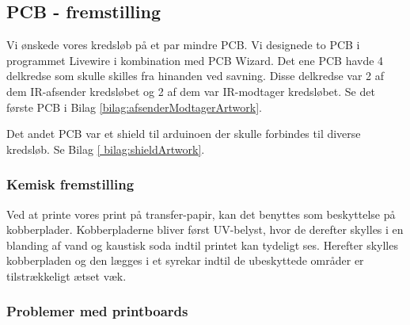 \subsection{PCB - fremstilling}\label{subs:pcbfremstilling}
Vi ønskede vores kredsløb på et par mindre PCB. Vi designede to PCB i programmet Livewire i kombination med PCB Wizard. Det ene PCB havde 4 delkredse som skulle skilles fra hinanden ved savning. Disse delkredse var 2 af dem IR-afsender kredsløbet og 2 af dem var IR-modtager kredsløbet. Se det første PCB i Bilag \ref{bilag:afsenderModtagerArtwork}. 

Det andet PCB var et shield til arduinoen der skulle forbindes til diverse kredsløb. Se Bilag \ref{  bilag:shieldArtwork}.
\subsubsection{Kemisk fremstilling}
Ved at printe vores print på transfer-papir, kan det benyttes som beskyttelse på kobberplader. Kobberpladerne bliver først UV-belyst, hvor de derefter skylles i en blanding af vand og kaustisk soda indtil printet kan tydeligt ses. Herefter skylles kobberpladen og den lægges i et syrekar indtil de ubeskyttede områder er tilstrækkeligt ætset væk.

\subsubsection{Problemer med printboards}




